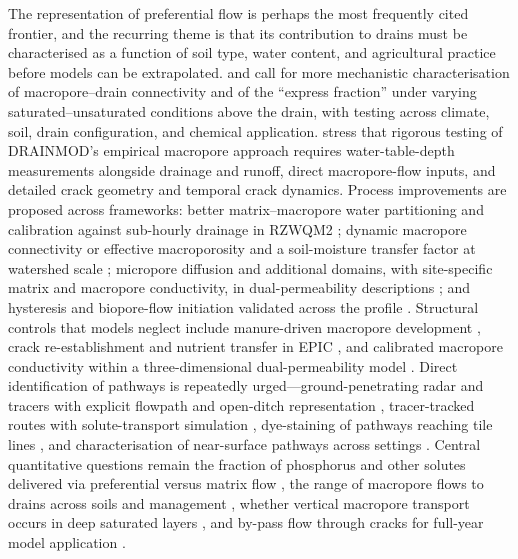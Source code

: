 The representation of preferential flow is perhaps the most frequently cited
frontier, and the recurring theme is that its contribution to drains must be
characterised as a function of soil type, water content, and agricultural
practice before models can be extrapolated. \textcite{Gaillot2023} and
\textcite{Fox2004} call for more mechanistic characterisation of
macropore--drain connectivity and of the ``express fraction'' under varying
saturated--unsaturated conditions above the drain, with testing across climate,
soil, drain configuration, and chemical application. \textcite{Askar2020} stress
that rigorous testing of DRAINMOD's empirical macropore approach requires
water-table-depth measurements alongside drainage and runoff, direct
macropore-flow inputs, and detailed crack geometry and temporal crack dynamics.
Process improvements are proposed across frameworks: better matrix--macropore
water partitioning and calibration against sub-hourly drainage in RZWQM2
\parencite{Li2023d}; dynamic macropore connectivity or effective macroporosity
and a soil-moisture transfer factor at watershed scale \parencite{Poon2021};
micropore diffusion and additional domains, with site-specific matrix and
macropore conductivity, in dual-permeability descriptions
\parencite{Villholth1998,Villholth1998b}; and hysteresis and biopore-flow
initiation validated across the profile \parencite{Holbak2021}. Structural
controls that models neglect include manure-driven macropore development
\parencite{Zhao2001}, crack re-establishment and nutrient transfer in EPIC
\parencite{Wang2022}, and calibrated macropore conductivity within a
three-dimensional dual-permeability model \parencite{Varvaris2018}. Direct
identification of pathways is repeatedly urged---ground-penetrating radar and
tracers with explicit flowpath and open-ditch representation
\parencite{Tähtikarhu2025}, tracer-tracked routes with solute-transport
simulation \parencite{Salo2017}, dye-staining of pathways reaching tile lines
\parencite{Nielsen2015}, and characterisation of near-surface pathways across
settings \parencite{Frey2012,Allaire2011}. Central quantitative questions
remain the fraction of phosphorus and other solutes delivered via preferential
versus matrix flow \parencite{King2015,Williams2016}, the range of macropore
flows to drains across soils and management \parencite{Reid2012}, whether
vertical macropore transport occurs in deep saturated layers
\parencite{Villholth1998}, and by-pass flow through cracks for full-year model
application \parencite{LESAFFRE1988,BACKLUND1995,Ruark2009}.

